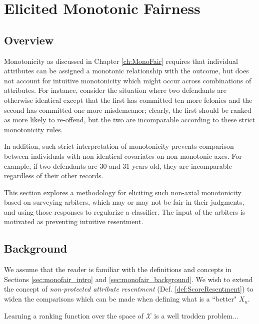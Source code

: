 \chapter{Elicited Monotonic Fairness}
\label{ch:SoftMonoFair}

\section{Overview}

    Monotonicity as discussed in Chapter \ref{ch:MonoFair} requires that individual attributes can be assigned a monotonic relationship with the outcome, but does not account for intuitive monotonicity which might occur across combinations of attributes.  For instance, consider the situation where two defendants are otherwise identical except that the first has committed ten more felonies and the second has committed one more misdemeanor; clearly, the first should be ranked as more likely to re-offend, but the two are incomparable according to these strict monotonicity rules.  
    
    In addition, such strict interpretation of monotonicity prevents comparison between individuals with non-identical covariates on non-monotonic axes.  For example, if two defendants are 30 and 31 years old, they are incomparable regardless of their other records.
    
    This section explores a methodology for eliciting such non-axial monotonicity based on surveying arbiters, which may or may not be fair in their judgments, and using those responses to regularize a classifier.  The input of the arbiters is motivated as preventing intuitive resentment. 

\section{Background}\label{sec:softmono_bg}
    
    We assume that the reader is familiar with the definitions and concepts in Sections \ref{sec:monofair_intro} and \ref{sec:monofair_background}.  We wish to extend the concept of \emph{non-protected attribute resentment} (Def. \ref{def:ScoreResentment}) to widen the comparisons which can be made when defining what is a ``better" $X_u$.
    
    Learning a ranking function over the space of $\mathcal{X}$ is a well trodden problem...
    
    
